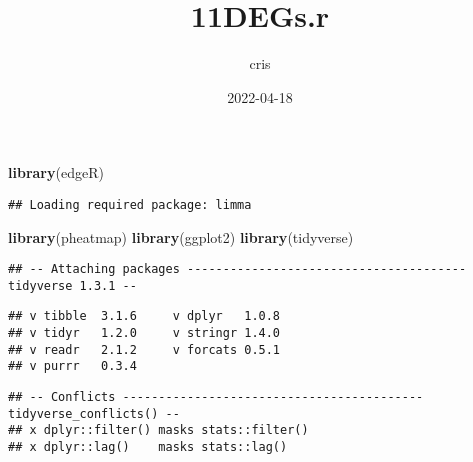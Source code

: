 \documentclass[]{article}
\title{11DEGs.r}
\author{cris}
\date{2022-04-18}
\newenvironment{Shaded}{\begin{snugshade}}{\end{snugshade}}
\newcommand{\KeywordTok}[1]{\textcolor[rgb]{0.13,0.29,0.53}{\textbf{#1}}}
\newcommand{\NormalTok}[1]{#1}
\begin{document}
\maketitle

\begin{Shaded}
\begin{Highlighting}[]
\KeywordTok{library}\NormalTok{(edgeR)}
\end{Highlighting}
\end{Shaded}

\begin{verbatim}
## Loading required package: limma
\end{verbatim}

\begin{Shaded}
\begin{Highlighting}[]
\KeywordTok{library}\NormalTok{(pheatmap)}
\KeywordTok{library}\NormalTok{(ggplot2)}
\KeywordTok{library}\NormalTok{(tidyverse)}
\end{Highlighting}
\end{Shaded}

\begin{verbatim}
## -- Attaching packages --------------------------------------- tidyverse 1.3.1 --
\end{verbatim}

\begin{verbatim}
## v tibble  3.1.6     v dplyr   1.0.8
## v tidyr   1.2.0     v stringr 1.4.0
## v readr   2.1.2     v forcats 0.5.1
## v purrr   0.3.4
\end{verbatim}

\begin{verbatim}
## -- Conflicts ------------------------------------------ tidyverse_conflicts() --
## x dplyr::filter() masks stats::filter()
## x dplyr::lag()    masks stats::lag()
\end{verbatim}
\end{document}
